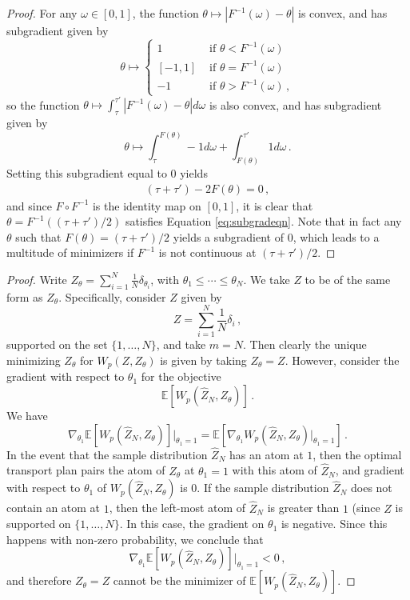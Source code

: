\documentclass[letterpaper]{article}
\begin{document}
\wonemidpoint*

\begin{proof}
For any $\omega \in [0,1]$, the function $\theta \mapsto |F^{-1}(\omega) - \theta|$ is convex, and has subgradient given by
\[
\theta \mapsto \begin{cases}
1 & \text{\ if\ } \theta < F^{-1}(\omega) \\
[-1, 1] & \text{\ if\ } \theta = F^{-1}(\omega) \\
-1 & \text{\ if\ } \theta > F^{-1}(\omega) \, ,
\end{cases}
\]
so the function $\theta \mapsto \int_{\tau}^{\tau'} |F^{-1}(\omega) - \theta|d\omega$ is also convex, and has subgradient given by
\[
\theta \mapsto \int_\tau^{F(\theta)} -1  d\omega + \int_{F(\theta)}^{\tau'} 1 d\omega \, .
\]
Setting this subgradient equal to $0$ yields
\begin{align}\label{eq:subgradeqn}
(\tau + \tau') - 2F(\theta) = 0 \, ,
\end{align}
and since $F \circ F^{-1}$ is the identity map on $[0,1]$, it is clear that $\theta = F^{-1}((\tau + \tau')/2)$ satisfies Equation \ref{eq:subgradeqn}. Note that in fact any $\theta$ such that $F(\theta) = (\tau + \tau')/2$ yields a subgradient of $0$, which leads to a multitude of minimizers if $F^{-1}$ is not continuous at $(\tau + \tau')/2$.
\end{proof}

\biasedgradients*

\begin{proof}
Write $Z_\theta = \sum_{i=1}^N \frac{1}{N} \delta_{\theta_i}$, with $\theta_1 \leq \cdots \leq \theta_N$. We take $Z$ to be of the same form as $Z_\theta$. Specifically, consider $Z$ given by
\[
Z = \sum_{i=1}^N \frac{1}{N} \delta_i \, ,
\]
supported on the set $\{1,\ldots, N\}$,
and take $m=N$.
Then clearly the unique minimizing $Z_\theta$ for $W_p(Z, Z_\theta)$ is given by taking $Z_\theta = Z$. However, consider the gradient with respect to $\theta_1$ for the objective
\[
\mathbb{E}[W_p(\hat{Z}_N, Z_\theta)] \, .
\]
We have
\[
\nabla_{\theta_1} \mathbb{E}[W_p(\hat{Z}_N, Z_\theta)] |_{\theta_1 = 1}  = \mathbb{E}[\nabla_{\theta_1}W_p(\hat{Z}_N, Z_\theta)|_{\theta_1=1}] \, .
\]
In the event that the sample distribution $\hat{Z}_N$ has an atom at $1$, then the optimal transport plan pairs the atom of $Z_\theta$ at $\theta_1=1$ with this atom of $\hat{Z}_N$, and gradient with respect to $\theta_1$ of $W_p(\hat{Z}_N, Z_\theta)$ is $0$. If the sample distribution $\hat{Z}_N$ does not contain an atom at $1$, then the left-most atom of $\hat{Z}_N$ is greater than $1$ (since $Z$ is supported on $\{1,\ldots, N\}$. In this case, the gradient on $\theta_1$ is negative. Since this happens with non-zero probability, we conclude that 
\[
\nabla_{\theta_1} \mathbb{E}[W_p(\hat{Z}_N, Z_\theta)] |_{\theta_1 = 1} < 0 \, ,
\]
and therefore $Z_\theta = Z$ cannot be the minimizer of $\mathbb{E}[W_p(\hat{Z}_N, Z_\theta)]$.
\end{proof}
\end{document}
